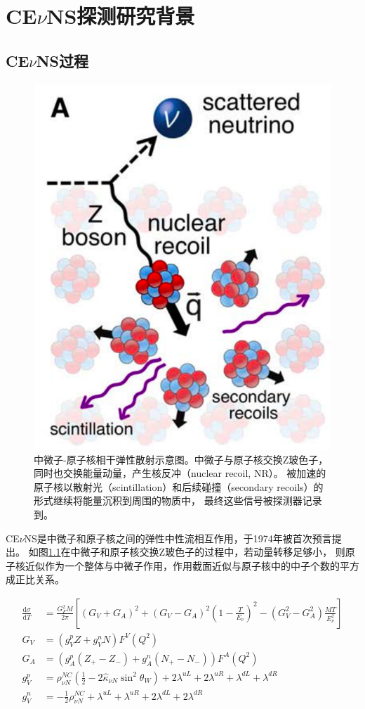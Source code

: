 
\chapter{CE$\nu$NS探测研究背景}

\section{CE$\nu$NS过程}

\begin{figure}
    \centering
    \includegraphics[width=0.4\linewidth]{figures/CEvNS_demo.png}
    \caption{中微子-原子核相干弹性散射示意图。中微子与原子核交换Z玻色子，同时也交换能量动量，产生核反冲（nuclear recoil, NR）。
    被加速的原子核以散射光（scintillation）和后续碰撞（secondary recoils）的形式继续将能量沉积到周围的物质中，
    最终这些信号被探测器记录到\cite{akimov_observation_2017}。}
    \label{fig:cevns_demo}
\end{figure}

CE$\nu$NS是中微子和原子核之间的弹性中性流相互作用，于1974年被首次预言提出\cite{freedman_coherent_1974,kopeliovich_isotopic_1974}。
如图\ref{fig:cevns_demo}在中微子和原子核交换Z玻色子的过程中，若动量转移足够小，
则原子核近似作为一个整体与中微子作用，作用截面近似与原子核中的中子个数的平方成正比关系。

\begin{align}
    \label{eq:cevns}
    \frac{\mathrm{d}\sigma}{\mathrm{d}T} &= \frac{G_F^2 M}{2\pi}\left[(G_V+G_A)^2+(G_V-G_A)^2(1-\frac{T}{E_{\nu}})^2-(G_V^2-G_A^2)\frac{MT}{E_{\nu}^2}\right] \\
    G_V &= (g_V^p Z+g_V^n N)F^V(Q^2) \\
    G_A &= (g_A^p(Z_{+}-Z_{-})+g_A^n(N_{+}-N_{-}))F^A(Q^2) \\
    g_V^p &= \rho_{\nu N}^{NC}(\frac{1}{2} - 2\hat{\kappa}_{\nu N}\sin^2\theta_W) + 2\lambda^{uL} + 2\lambda^{uR} + \lambda^{dL} + \lambda^{dR} \\
    g_V^n &= -\frac{1}{2}\rho_{\nu N}^{NC} + \lambda^{uL} + \lambda^{uR} + 2\lambda^{dL} + 2\lambda^{dR}
\end{align}

